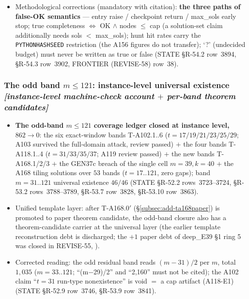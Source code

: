 \begin{itemize}
$27$ bands and the residuals $406/3{,}916$ re-measured bitwise unchanged
before writing (A200/A201/A208, repeated); three unclosed band-heads: $m=68$
residual $k=[69]$, $m=70$ residual $[71,72]$, $m=72$ residual $[73,74,75]$
(STATE \S R-56.4 rows~4041--4043, \S R-56.8 row~4061, \S R-57.4 row~4105,
\S R-58.6 row~4175).
\item Methodological corrections (mandatory with citation): \textbf{the
three paths of false-OK semantics} --- entry raise / checkpoint return /
max\_sols early stop; true completeness $\iff$ OK $\wedge$ nodes $\le$ cap
(a solution-set claim additionally needs sols $<$ max\_sols); hunt hit rates
carry the \texttt{PYTHONHASHSEED} restriction (the A156 figures do not
transfer); `?' (undecided budget) must never be written as true or false
(STATE \S R-54.2 row~3894, \S R-54.3 row~3902, FRONTIER (REVISE-58) row~38).
\end{itemize}

\subsubsection{The odd band $m\le121$: instance-level universal existence
\emph{[instance-level machine-check account $+$ per-band theorem
candidates]}}\label{subsubsec:add-oddband}

\begin{itemize}
\item \textbf{The odd-band $m\le121$ coverage ledger closed at instance
level, $862\to0$}: the six exact-window bands T-A102.1..6
($t=17/19/21/23/25/29$; A103 survived the full-domain attack, review
passed) $+$ the four bands T-A118.1..4 ($t=31/33/35/37$; A119 review
passed) $+$ the new bands T-A168.1/2/3 $+$ the GEN37c breach of the single
cell $m=39,k=40$ $+$ the A168 tiling solutions over $53$ bands
($t=17..121$, zero gaps); band $m=31..121$ universal existence $46/46$
(STATE \S R-52.2 rows~3723--3724, \S R-53.2 rows~3788--3789, \S R-53.7
row~3828, \S R-53.10 row~3863).
\item Unified template layer: after T-A168.0$'$ (\S\ref{subsec:add-ta168paper})
is promoted to paper theorem candidate, the odd-band closure also has a
theorem-candidate carrier at the universal layer (the earlier template
reconstruction debt is discharged; the $+1$ paper debt of deep\_E39 \S1
ring 5 was closed in REVISE-55, ).
\item Corrected reading: the odd residual band reads $(m-31)/2$ per $m$,
total $1{,}035$ ($m=33..121$; ``(m$-$29)/2'' and ``2{,}160'' must not be
cited); the A102 claim ``$t=31$ run-type nonexistence'' is void $=$ a cap
artifact (A118-E1) (STATE \S R-52.9 row~3746, \S R-53.9 row~3841).
\end{itemize}

